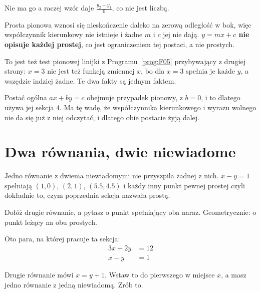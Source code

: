 \begin{fr}
\begin{ansblock}
Nie ma go \dash{} a raczej wzór daje $\frac{y_2 - y_1}{0}$, co nie jest
liczbą.
\end{ansblock}

Prosta pionowa wznosi się nieskończenie daleko na zerową odległość w bok, więc
współczynnik kierunkowy nie istnieje i żadne $m$ i $c$ jej nie dają.
\textbf{$y = mx + c$ nie opisuje każdej prostej}, co jest ograniczeniem tej
postaci, a nie prostych.

To jest też test pionowej linijki z Programu~\ref{prog:F05} przybywający z
drugiej strony: $x = 3$ nie jest też funkcją zmiennej $x$, bo dla $x = 3$
spełnia je każde $y$, a wszędzie indziej żadne. Te dwa fakty są jednym faktem.

\begin{note}
Postać ogólna $ax + by = c$ obejmuje przypadek pionowy, z $b = 0$, i to
dlatego używa jej sekcja 4. Ma tę wadę, że współczynnika kierunkowego i wyrazu
wolnego nie da się już z niej odczytać, i dlatego obie postacie żyją dalej.
\end{note}
\end{fr}

\section{Dwa równania, dwie niewiadome}
\label{sec:F06-simultaneous}

\begin{fr}
Jedno równanie z dwiema niewiadomymi nie przyszpila żadnej z nich.
$x - y = 1$ spełniają $(1, 0)$, $(2, 1)$, $(\num{5.5}, \num{4.5})$ i każdy
inny punkt pewnej prostej \dash{} czyli dokładnie to, czym poprzednia sekcja
nazwała prostą.

Dołóż drugie równanie, a pytasz o punkt spełniający oba naraz. Geometrycznie:
o punkt leżący na obu prostych.

Oto para, na której pracuje ta sekcja:
\begin{align*}
3x + 2y &= 12 \\
x - y &= 1
\end{align*}

Drugie równanie mówi $x = y + 1$. Wstaw to do pierwszego w miejsce $x$, a masz
jedno równanie z jedną niewiadomą. Zrób to.
\nextframe
\end{fr}


